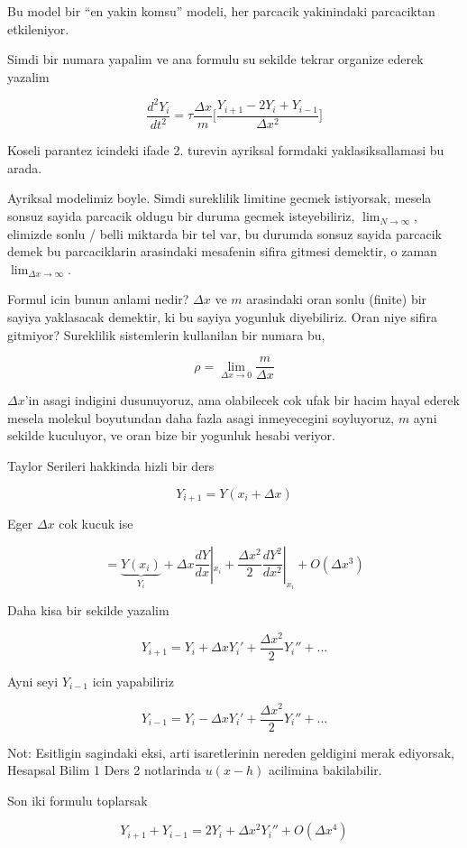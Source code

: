 \documentclass[12pt,fleqn]{article}
\begin{document}
Bu model bir ``en yakin komsu'' modeli, her parcacik yakinindaki
parcaciktan etkileniyor. 

Simdi bir numara yapalim ve ana formulu su sekilde tekrar organize ederek
yazalim

\[ \frac{d^2Y_i}{dt^2} = 
\tau \frac{\Delta x}{m} \bigg[
\frac{Y_{i+1} - 2Y_i + Y_{i-1}}{\Delta x^2}
\bigg]
\]

Koseli parantez icindeki ifade 2. turevin ayriksal formdaki
yaklasiksallamasi bu arada. 

Ayriksal modelimiz boyle. Simdi sureklilik limitine gecmek istiyorsak,
mesela sonsuz sayida parcacik oldugu bir duruma gecmek isteyebiliriz,
$\lim_{N \to \infty}$, elimizde sonlu / belli miktarda bir tel var, bu durumda 
sonsuz sayida parcacik demek bu parcaciklarin arasindaki mesafenin sifira 
gitmesi demektir, o zaman $\lim_{\Delta x \to \infty}$. 

Formul icin bunun anlami nedir? $\Delta x$ ve $m$ arasindaki oran sonlu
(finite) bir sayiya yaklasacak demektir, ki bu sayiya yogunluk
diyebiliriz. Oran niye sifira gitmiyor? Sureklilik sistemlerin kullanilan
bir numara bu,

\[ \rho = \lim_{\Delta x \to 0} \frac{m}{\Delta x} \]

$\Delta x$'in asagi indigini dusunuyoruz, ama olabilecek cok ufak bir hacim
hayal ederek mesela molekul boyutundan daha fazla asagi inmeyecegini
soyluyoruz, $m$ ayni sekilde kuculuyor, ve oran bize bir yogunluk hesabi
veriyor.

Taylor Serileri hakkinda hizli bir ders

\[ Y_{i+1}=Y(x_i + \Delta x) \]

Eger $\Delta x$ cok kucuk ise

\[ = 
\underbrace{Y(x_i)}_{Y_i} + \Delta x \frac{dY}{dx}|_{x_i} + 
\frac{\Delta x^2}{2}\frac{dY^2}{dx^2}|_{x_i} + 
O(\Delta x^3)
\]

Daha kisa bir sekilde yazalim

\[ Y_{i+1} = Y_i + \Delta x Y_i' + \frac{\Delta x^2}{2}Y_i'' + ... 
\]

Ayni seyi $Y_{i-1}$ icin yapabiliriz

\[ Y_{i-1} = Y_i - \Delta x Y_i' + \frac{\Delta x^2}{2}Y_i'' + ... 
\]

Not: Esitligin sagindaki eksi, arti isaretlerinin nereden geldigini merak
ediyorsak, Hesapsal Bilim 1 Ders 2 notlarinda $u(x-h)$ acilimina
bakilabilir. 

Son iki formulu toplarsak

\[ Y_{i+1} + Y_{i-1} = 2Y_i + \Delta x^2 Y_i''  + O(\Delta x^4)\]
\end{document}
